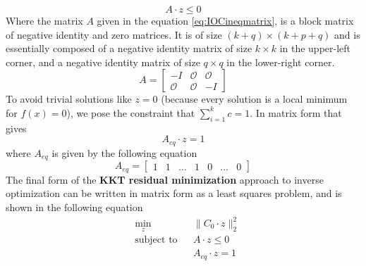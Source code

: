\documentclass[12pt, a4paper]{article}
\newcommand{\norm}[1]{\lVert#1\rVert_2}         %
\begin{document}
\begin{equation} \label{eq:IOCineqconstraints}
    A \cdot z \leq 0
\end{equation}
Where the matrix \( A\) given in the equation \eqref{eq:IOCineqmatrix}, is a block matrix of negative identity and zero matrices. It is of size \((k+q) \times (k+p+q)\) and is essentially composed of a negative identity matrix of size \( k \times k\) in the upper-left corner, and a negative identity matrix of size \( q \times q\) in the lower-right corner.
\begin{equation} \label{eq:IOCineqmatrix}
    A = \begin{bmatrix}
            -I & \mathcal{O} & \mathcal{O} \\
            \mathcal{O} & \mathcal{O} & -I
        \end{bmatrix}
\end{equation}
To avoid trivial solutions like \( z = 0\) (because every solution is a local minimum for $f(x)=0$), we pose the constraint that \( \sum_{i=1}^k c = 1\). In matrix form that gives
\begin{equation}
    A_{eq} \cdot z = 1
\end{equation}
where \(A_{eq}\) is given by the following equation
\begin{equation} \label{eq:IOCeqmatrix}
A_{eq} = \begin{bmatrix}
1 & 1 & \ldots & 1 & 0 & \dots & 0
\end{bmatrix}
\end{equation}
The final form of the \textbf{KKT residual minimization} approach to inverse optimization can be written in matrix form as a least squares problem, and is shown in the following equation
\begin{equation} \label{eq:ResidualMinimizationMatrixForm}
    \begin{aligned}
    &\min_{z} & & \norm{ C_0 \cdot z}^2 \\
    &\text{subject to} & & A \cdot z \leq 0 \\
    &                  & & A_{eq} \cdot z = 1
    \end{aligned}
\end{equation}
\end{document}
